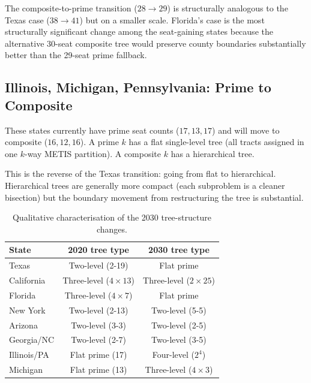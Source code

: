The composite-to-prime transition ($28 \to 29$) is structurally analogous
to the Texas case ($38 \to 41$) but on a smaller scale.
Florida's case is the most structurally significant change among the
seat-gaining states because the alternative 30-seat composite tree would
preserve county boundaries substantially better than the 29-seat prime
fallback.

\subsection{Illinois, Michigan, Pennsylvania: Prime to Composite}

These states currently have prime seat counts ($17, 13, 17$) and will
move to composite ($16, 12, 16$).
A prime $k$ has a flat single-level tree (all tracts assigned in one
$k$-way METIS partition).
A composite $k$ has a hierarchical tree.

This is the reverse of the Texas transition: going from flat to hierarchical.
Hierarchical trees are generally more compact (each subproblem is a cleaner
bisection) but the boundary movement from restructuring the tree is substantial.

\begin{table}[h]
\centering
\caption{Qualitative characterisation of the 2030 tree-structure changes.}
\label{tab:tree-changes}
\begin{tabular}{lcc}
\toprule
State & 2020 tree type & 2030 tree type \\
\midrule
Texas & Two-level (2-19) & Flat prime \\
California & Three-level ($4 \times 13$) & Three-level ($2 \times 25$) \\
Florida & Three-level ($4 \times 7$) & Flat prime \\
New York & Two-level (2-13) & Two-level (5-5) \\
Arizona & Two-level (3-3) & Two-level (2-5) \\
Georgia/NC & Two-level (2-7) & Two-level (3-5) \\
Illinois/PA & Flat prime (17) & Four-level ($2^4$) \\
Michigan & Flat prime (13) & Three-level ($4 \times 3$) \\
\bottomrule
\end{tabular}
\end{table}
